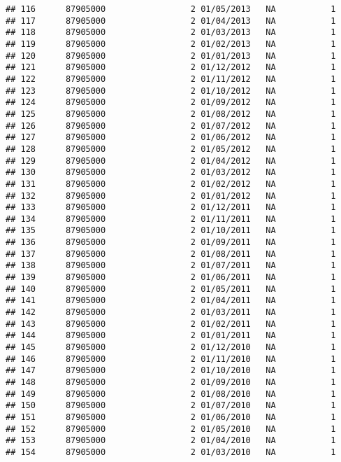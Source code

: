 \documentclass[
]{article}
\begin{document}
\begin{verbatim}
## 116      87905000                 2 01/05/2013   NA           1
## 117      87905000                 2 01/04/2013   NA           1
## 118      87905000                 2 01/03/2013   NA           1
## 119      87905000                 2 01/02/2013   NA           1
## 120      87905000                 2 01/01/2013   NA           1
## 121      87905000                 2 01/12/2012   NA           1
## 122      87905000                 2 01/11/2012   NA           1
## 123      87905000                 2 01/10/2012   NA           1
## 124      87905000                 2 01/09/2012   NA           1
## 125      87905000                 2 01/08/2012   NA           1
## 126      87905000                 2 01/07/2012   NA           1
## 127      87905000                 2 01/06/2012   NA           1
## 128      87905000                 2 01/05/2012   NA           1
## 129      87905000                 2 01/04/2012   NA           1
## 130      87905000                 2 01/03/2012   NA           1
## 131      87905000                 2 01/02/2012   NA           1
## 132      87905000                 2 01/01/2012   NA           1
## 133      87905000                 2 01/12/2011   NA           1
## 134      87905000                 2 01/11/2011   NA           1
## 135      87905000                 2 01/10/2011   NA           1
## 136      87905000                 2 01/09/2011   NA           1
## 137      87905000                 2 01/08/2011   NA           1
## 138      87905000                 2 01/07/2011   NA           1
## 139      87905000                 2 01/06/2011   NA           1
## 140      87905000                 2 01/05/2011   NA           1
## 141      87905000                 2 01/04/2011   NA           1
## 142      87905000                 2 01/03/2011   NA           1
## 143      87905000                 2 01/02/2011   NA           1
## 144      87905000                 2 01/01/2011   NA           1
## 145      87905000                 2 01/12/2010   NA           1
## 146      87905000                 2 01/11/2010   NA           1
## 147      87905000                 2 01/10/2010   NA           1
## 148      87905000                 2 01/09/2010   NA           1
## 149      87905000                 2 01/08/2010   NA           1
## 150      87905000                 2 01/07/2010   NA           1
## 151      87905000                 2 01/06/2010   NA           1
## 152      87905000                 2 01/05/2010   NA           1
## 153      87905000                 2 01/04/2010   NA           1
## 154      87905000                 2 01/03/2010   NA           1

\end{verbatim}
\end{document}
